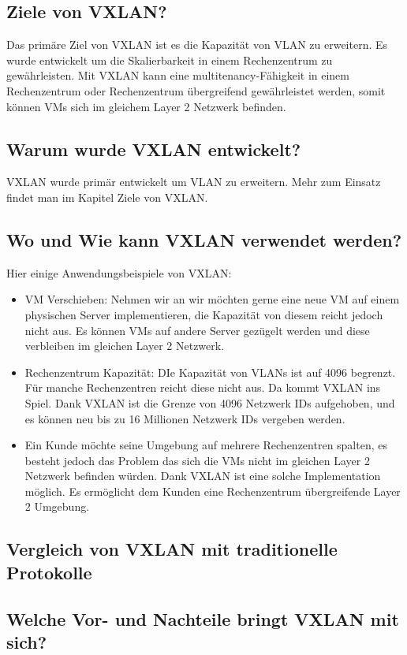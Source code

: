 \documentclass[a4,12pt]{scrartcl}
\begin{document}
\subsection{Ziele von VXLAN?}
Das primäre Ziel von VXLAN ist es die Kapazität von VLAN zu erweitern. Es wurde entwickelt um die Skalierbarkeit in einem Rechenzentrum zu gewährleisten. Mit VXLAN kann eine multitenancy-Fähigkeit in einem Rechenzentrum oder Rechenzentrum übergreifend gewährleistet werden, somit können VMs sich im gleichem Layer 2 Netzwerk befinden. 

\subsection{Warum wurde VXLAN entwickelt?}
VXLAN wurde primär entwickelt um VLAN zu erweitern. Mehr zum Einsatz findet man im Kapitel Ziele von VXLAN. 

\subsection{Wo und Wie kann VXLAN verwendet werden?}
Hier einige Anwendungsbeispiele von VXLAN: 
\begin{itemize}
\item VM Verschieben: Nehmen wir an wir möchten gerne eine neue VM auf einem physischen Server implementieren, die Kapazität von diesem reicht jedoch nicht aus. Es können VMs auf andere Server gezügelt werden und diese verbleiben im gleichen Layer 2 Netzwerk. 
\item Rechenzentrum Kapazität: DIe Kapazität von VLANs ist auf 4096 begrenzt. Für manche Rechenzentren reicht diese nicht aus. Da kommt VXLAN ins Spiel. Dank VXLAN ist die Grenze von 4096 Netzwerk IDs aufgehoben, und es können neu bis zu 16 Millionen Netzwerk IDs vergeben werden. 
\item Ein Kunde möchte seine Umgebung auf mehrere Rechenzentren spalten, es besteht jedoch das Problem das sich die VMs nicht im gleichen Layer 2 Netzwerk befinden würden. Dank VXLAN ist eine solche Implementation möglich. Es ermöglicht dem Kunden eine Rechenzentrum übergreifende Layer 2 Umgebung. 
\end{itemize}

\subsection{Vergleich von VXLAN mit traditionelle Protokolle}

\subsection{Welche Vor- und Nachteile bringt VXLAN mit sich?}
\end{document}
